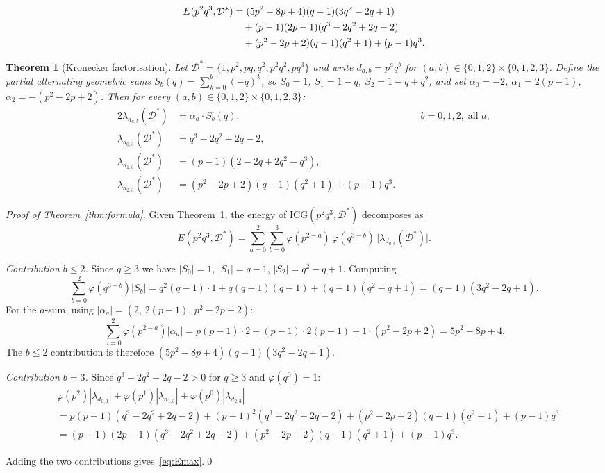 \documentclass[10pt,a4paper]{amsart}
\newtheorem{theorem}{Theorem}
\newcommand{\Dstar}{\mathcal{D}^*}
\newcommand{\ICG}{\mathrm{ICG}}
\newcommand{\vp}{\varphi}
\begin{document}
\begin{align}
  E(p^2q^3,\Dstar)
  &= (5p^2-8p+4)(q-1)(3q^2-2q+1) \notag\\
  &\quad + (p-1)(2p-1)(q^3-2q^2+2q-2) \\
  &\quad + (p^2-2p+2)(q-1)(q^2+1)+(p-1)q^3. \notag
\end{align}

\begin{theorem}[Kronecker factorisation]\label{thm:kronecker}
Let $\Dstar=\{1,p^2,pq,q^2,p^2q^2,pq^3\}$ and write $d_{a,b}=p^aq^b$
for $(a,b)\in\{0,1,2\}\times\{0,1,2,3\}$.  Define the partial alternating
geometric sums $S_b(q)=\sum_{k=0}^{b}(-q)^k$, so $S_0=1$, $S_1=1-q$,
$S_2=1-q+q^2$, and set $\alpha_0=-2$, $\alpha_1=2(p-1)$,
$\alpha_2=-(p^2-2p+2)$.  Then for every
$(a,b)\in\{0,1,2\}\times\{0,1,2,3\}$:
\begin{alignat}{2}
  \lambda_{d_{a,b}}(\Dstar) &= \alpha_a\cdot S_b(q),
  &&\quad b=0,1,2,\;\text{all }a,\label{eq:lam-b012}\\
  \lambda_{d_{0,3}}(\Dstar) &= q^3-2q^2+2q-2,
  &&\quad \label{eq:lam-03}\\
  \lambda_{d_{1,3}}(\Dstar) &= (p-1)(2-2q+2q^2-q^3),
  &&\quad \label{eq:lam-13}\\
  \lambda_{d_{2,3}}(\Dstar) &= (p^2-2p+2)(q-1)(q^2+1)+(p-1)q^3.
  &&\quad \label{eq:lam-23}
\end{alignat}
\end{theorem}

\begin{proof}[Proof of Theorem~\ref{thm:formula}]
Given Theorem~\ref{thm:kronecker}, the energy of $\ICG(p^2q^3,\Dstar)$
decomposes as
\[
  E(p^2q^3,\Dstar)
  = \sum_{a=0}^{2}\sum_{b=0}^{3}
    \vp(p^{2-a})\,\vp(q^{3-b})\,
    \bigl|\lambda_{d_{a,b}}(\Dstar)\bigr|.
\]

\textit{Contribution $b\le2$.}  Since $q\ge3$ we have $|S_0|=1$,
$|S_1|=q-1$, $|S_2|=q^2-q+1$.  Computing
\[
  \sum_{b=0}^{2}\vp(q^{3-b})|S_b|
  = q^2(q-1)\cdot1 + q(q-1)(q-1) + (q-1)(q^2-q+1)
  = (q-1)(3q^2-2q+1).
\]
For the $a$-sum, using $|\alpha_a|=(2,\,2(p-1),\,p^2-2p+2)$:
\[
  \sum_{a=0}^{2}\vp(p^{2-a})|\alpha_a|
  = p(p-1)\cdot2 + (p-1)\cdot2(p-1) + 1\cdot(p^2-2p+2)
  = 5p^2-8p+4.
\]
The $b\le2$ contribution is therefore $(5p^2-8p+4)(q-1)(3q^2-2q+1)$.

\textit{Contribution $b=3$.}  Since $q^3-2q^2+2q-2>0$ for $q\ge3$ and
$\vp(q^0)=1$:
\begin{align*}
  &\vp(p^2)|\lambda_{d_{0,3}}|+\vp(p^1)|\lambda_{d_{1,3}}|
   +\vp(p^0)|\lambda_{d_{2,3}}|\\
  &= p(p-1)(q^3-2q^2+2q-2)+(p-1)^2(q^3-2q^2+2q-2)
   +(p^2-2p+2)(q-1)(q^2+1)+(p-1)q^3\\
  &= (p-1)(2p-1)(q^3-2q^2+2q-2)+(p^2-2p+2)(q-1)(q^2+1)+(p-1)q^3.
\end{align*}

Adding the two contributions gives~\eqref{eq:Emax}.\qed
\end{proof}
\end{document}
